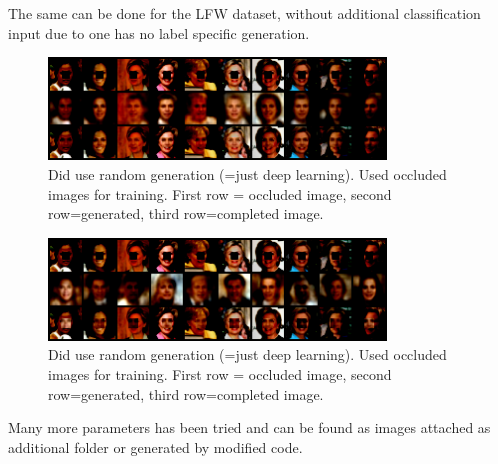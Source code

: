 \documentclass[
     11pt,         %
     a4paper,      %
     oneside,
     ]{article}
\begin{document}
The same can be done for the LFW dataset, without additional classification input due to one has no label specific generation.
\begin{figure}[H]
  \begin{center}
    \includegraphics[width=0.8\textwidth]{presentation_results/VAE/LFW-VAE-useRandom_false-useOccludedForTrain_True.png}
    \caption{Did use random generation (=just deep learning). Used occluded images for training.  First row = occluded image, second row=generated, third row=completed image.}
  \end{center}
\end{figure}
\begin{figure}[H]
  \begin{center}
    \includegraphics[width=0.8\textwidth]{presentation_results/VAE/LFW-VAE-useRandom_True-useOccludedForTrain_False.png}
    \caption{Did use random generation (=just deep learning). Used occluded images for training.  First row = occluded image, second row=generated, third row=completed image.}
  \end{center}
\end{figure}
 Many more parameters has been tried and can be found as images attached as additional folder or generated by modified code.
\end{document}
